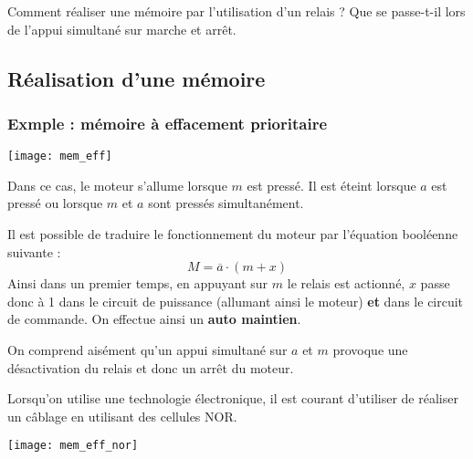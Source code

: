 \begin{obj}
Comment réaliser une mémoire par l'utilisation d'un relais ? 
Que se passe-t-il lors de l'appui simultané sur marche et arrêt. 
\end{obj}

\subsection{Réalisation d'une mémoire}
\subsubsection*{Exmple : mémoire à effacement prioritaire}
\begin{marginfigure}
\begin{center}
\texttt{[image: mem\_eff]}
\end{center}
\end{marginfigure}
Dans ce cas, le moteur s'allume lorsque $m$ est pressé. Il est éteint lorsque $a$ est pressé ou lorsque $m$ et $a$ sont pressés simultanément.
 
 
 
Il est possible de traduire le fonctionnement du moteur par l'équation booléenne suivante : 
$$
M = \overline{a} \cdot \left(m +  x \right)
$$
Ainsi dans un premier temps, en appuyant sur $m$ le relais est actionné, $x$ passe donc à 1 dans le circuit de puissance (allumant ainsi le moteur) \textbf{et} dans le circuit de commande. On effectue ainsi un \textbf{auto maintien}. 

On comprend aisément qu'un appui simultané sur $a$ et $m$ provoque une désactivation du relais et donc un arrêt du moteur. 

Lorsqu'on utilise une technologie électronique, il est courant d'utiliser de réaliser un câblage en utilisant des cellules NOR. 



\begin{marginfigure}
\begin{center}
\texttt{[image: mem\_eff\_nor]}
\end{center}
\end{marginfigure}

